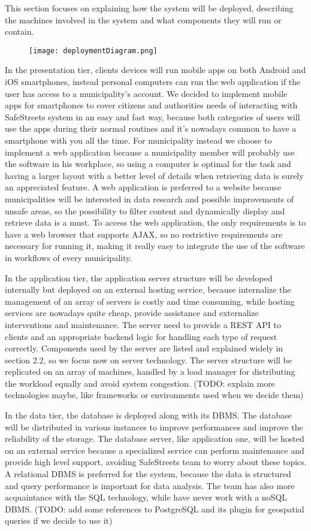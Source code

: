 This section focuses on explaining how the system will be deployed, describing the machines involved in the system and what components they will run or contain.

\begin{figure}[H]
	\texttt{[image: deploymentDiagram.png]}
\end{figure}

In the presentation tier, clients devices will run mobile apps on both Android and iOS smartphones, instead personal computers can run the web application if the user has access to a municipality's account. We decided to implement mobile apps for smartphones to cover citizens and authorities needs of interacting with SafeStreets system in an easy and fast way, because both categories of users will use the apps during their normal routines and it's nowadays common to have a smartphone with you all the time. For municipality instead we choose to implement a web application because a municipality member will probably use the software in his workplace, so using a computer is optimal for the task and having a larger layout with a better level of details when retrieving data is surely an appreciated feature. A web application is preferred to a website because municipalities will be interested in data research and possible improvements of unsafe areas, so the possibility to filter content and dynamically display and retrieve data is a must. To access the web application, the only requirements is to have a web browser that supports AJAX, so no restrictive requirements are necessary for running it, making it really easy to integrate the use of the software in workflows of every municipality.

In the application tier, the application server structure will be developed internally but deployed on an external hosting service, because internalize the management of an array of servers is costly and time consuming, while hosting services are nowadays quite cheap, provide assistance and externalize interventions and maintenance. The server need to provide a REST API to clients and an appropriate backend logic for handling each type of request correctly. Components used by the server are listed and explained widely in section 2.2, so we focus now on server technology. The server structure will be replicated on an array of machines, handled by a load manager for distributing the workload equally and avoid system congestion. (TODO: explain more technologies maybe, like frameworks or environments used when we decide them)

In the data tier, the database is deployed along with its DBMS. The database will be distributed in various instances to improve performances and improve the reliability of the storage. The database server, like application one, will be hosted on an external service because a specialized service can perform maintenance and provide high level support, avoiding SafeStreets team to worry about these topics. A relational DBMS is preferred for the system, because the data is structured and query performance is important for data analysis. The team has also more acquaintance with the SQL technology, while have never work with a noSQL DBMS. (TODO: add some references to PostgreSQL and its plugin for geospatial queries if we decide to use it)
